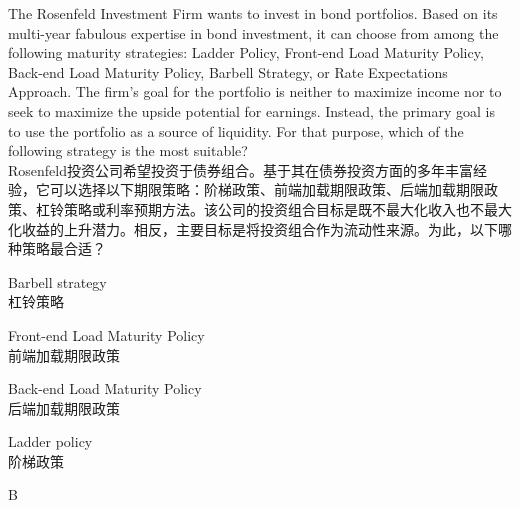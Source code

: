\documentclass{article}
\newcounter{question} %
\begin{document}
\begin{question}
    The Rosenfeld Investment Firm wants to invest in bond portfolios. Based on its multi-year fabulous expertise in bond investment, it can choose from among the following maturity strategies: Ladder Policy, Front-end Load Maturity Policy, Back-end Load Maturity Policy, Barbell Strategy, or Rate Expectations Approach. The firm's goal for the portfolio is neither to maximize income nor to seek to maximize the upside potential for earnings. Instead, the primary goal is to use the portfolio as a source of liquidity. For that purpose, which of the following strategy is the most suitable?\\
    Rosenfeld投资公司希望投资于债券组合。基于其在债券投资方面的多年丰富经验，它可以选择以下期限策略：阶梯政策、前端加载期限政策、后端加载期限政策、杠铃策略或利率预期方法。该公司的投资组合目标是既不最大化收入也不最大化收益的上升潜力。相反，主要目标是将投资组合作为流动性来源。为此，以下哪种策略最合适？
\end{question}

\begin{choices}
    \item Barbell strategy\\
    杠铃策略
    \item Front-end Load Maturity Policy\\
    前端加载期限政策
    \item Back-end Load Maturity Policy\\
    后端加载期限政策
    \item Ladder policy\\
    阶梯政策
\end{choices}

\begin{correctanswer}
    B
\end{correctanswer}
\end{document}
